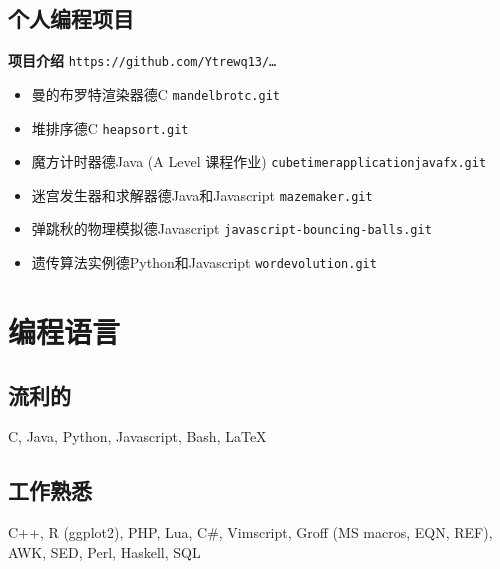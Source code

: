 \documentclass[10pt]{extarticle}
\begin{document}
    \subsection{个人编程项目} %
    \hspace{1em} \textbf{项目介绍} %
    \hfill
    \texttt{https://github.com/Ytrewq13/\ldots}
    \begin{itemize}
        \item 曼的布罗特渲染器德C
            \hfill
            \texttt{mandelbrotc.git}
        \item 堆排序德C
            \hfill
            \texttt{heapsort.git}
        \item 魔方计时器德Java
            \hfill
            (A Level 课程作业)
            \hfill
            \texttt{cubetimerapplicationjavafx.git}
        \item 迷宫发生器和求解器德Java和Javascript
            \hfill
            \texttt{mazemaker.git}
        \item 弹跳秋的物理模拟德Javascript
            \hfill
            \texttt{javascript-bouncing-balls.git}
        \item 遗传算法实例德Python和Javascript
            \hfill
            \texttt{wordevolution.git}
    \end{itemize}
    \section{编程语言} %
    \subsection{流利的} %
    C, Java, Python, Javascript, Bash, \LaTeX{}
    \subsection{工作熟悉} %
    C++, R (ggplot2), PHP, Lua, C\#, Vimscript, Groff (MS macros, EQN, REF),
    AWK, SED, Perl, Haskell, SQL
\end{document}

